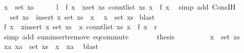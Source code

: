 \begin{isabellebody}
\ {\isachardoublequoteopen}x\ {\isasymin}\ set\ xs{\isachardoublequoteclose}\isanewline
\ \ \ \ \isamarkupfalse%
\ {\isachardoublequoteopen}{\isacharquery}{\kern0pt}l\ {\isacharequal}{\kern0pt}\ f\ x\ {\isacharplus}{\kern0pt}\ {\isacharparenleft}{\kern0pt}{\isasymSum}x{\isasymin}set\ xs{\isachardot}{\kern0pt}\ count{\isacharunderscore}{\kern0pt}list\ xs\ x\ {\isacharasterisk}{\kern0pt}\ f\ x{\isacharparenright}{\kern0pt}{\isachardoublequoteclose}\ \isamarkupfalse%
\ {\isacharparenleft}{\kern0pt}simp\ add{\isacharcolon}{\kern0pt}\ Cons{\isachardot}{\kern0pt}IH{\isacharparenright}{\kern0pt}\isanewline
\ \ \ \ \isamarkupfalse%
\ \isamarkupfalse%
\ {\isachardoublequoteopen}set\ xs\ {\isacharequal}{\kern0pt}\ insert\ x\ {\isacharparenleft}{\kern0pt}set\ xs\ {\isacharminus}{\kern0pt}\ {\isacharbraceleft}{\kern0pt}x{\isacharbraceright}{\kern0pt}{\isacharparenright}{\kern0pt}{\isachardoublequoteclose}\ \isamarkupfalse%
\ {\isacartoucheopen}x\ {\isasymin}\ set\ xs{\isacartoucheclose}\isamarkupfalse%
\ blast\isanewline
\ \ \ \ \isamarkupfalse%
\ \isamarkupfalse%
\ {\isachardoublequoteopen}f\ x\ {\isacharplus}{\kern0pt}\ {\isacharparenleft}{\kern0pt}{\isasymSum}x{\isasymin}insert\ x\ {\isacharparenleft}{\kern0pt}set\ xs\ {\isacharminus}{\kern0pt}\ {\isacharbraceleft}{\kern0pt}x{\isacharbraceright}{\kern0pt}{\isacharparenright}{\kern0pt}{\isachardot}{\kern0pt}\ count{\isacharunderscore}{\kern0pt}list\ xs\ x\ {\isacharasterisk}{\kern0pt}\ f\ x{\isacharparenright}{\kern0pt}\ {\isacharequal}{\kern0pt}\ {\isacharquery}{\kern0pt}r{\isachardoublequoteclose}\isanewline
\ \ \ \ \ \ \isamarkupfalse%
\ {\isacharparenleft}{\kern0pt}simp\ add{\isacharcolon}{\kern0pt}\ sum{\isachardot}{\kern0pt}insert{\isacharunderscore}{\kern0pt}remove\ eq{\isacharunderscore}{\kern0pt}commute{\isacharparenright}{\kern0pt}\isanewline
\ \ \ \ \isamarkupfalse%
\ \isamarkupfalse%
\ {\isacharquery}{\kern0pt}thesis\ \isacommand{{\isachardot}{\kern0pt}}\isamarkupfalse%
\isanewline
\ \ \isamarkupfalse%
\isanewline
\ \ \ \ \isamarkupfalse%
\ {\isachardoublequoteopen}x\ {\isasymnotin}\ set\ xs{\isachardoublequoteclose}\isanewline
\ \ \ \ \isamarkupfalse%
\ {\isachardoublequoteopen}{\isasymAnd}xa{\isachardot}{\kern0pt}\ xa\ {\isasymin}\ set\ xs\ {\isasymLongrightarrow}\ x\ {\isasymnoteq}\ xa{\isachardoublequoteclose}\ \isamarkupfalse%
\ blast\isanewline
\ \ \ \ \isamarkupfalse%

\end{isabellebody}
